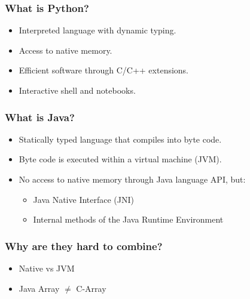 \documentclass[%
]{beamer}
\begin{document}
\begin{frame}
    \frametitle{What is Python?}
    \begin{itemize}
          \item<1-> Interpreted language with dynamic typing.
          \item<1-> Access to native memory.
          \item<1-> Efficient software through C/C++ extensions.
          \item<1-> Interactive shell and notebooks.
    \end{itemize}
\end{frame}

\begin{frame}
    \frametitle{What is Java?}
    \begin{itemize}
          \item<1-> Statically typed language that compiles into byte code.
          \item<1-> Byte code is executed within a virtual machine (JVM).
          \item<1-> No access to native memory through Java language API, but:
        \begin{itemize}
              \item Java Native Interface (JNI)
              \item Internal methods of the Java Runtime Environment
        \end{itemize}

    \end{itemize}
\end{frame}

\begin{frame}
    \frametitle{Why are they hard to combine?}
    \begin{itemize}
          \item Native vs JVM
          \item Java Array $\neq$ C-Array
    \end{itemize}
\end{frame}
\end{document}
